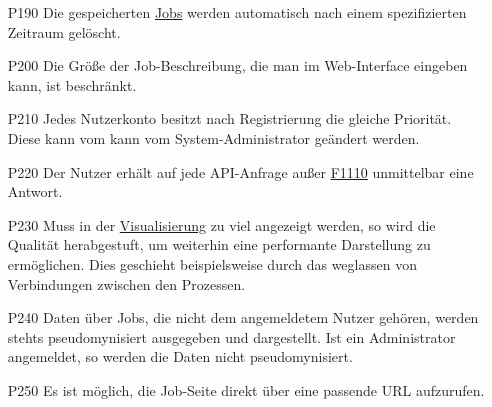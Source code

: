 \begin{itemize}[noitemsep]
    \item[P190] Die gespeicherten \hyperref[B:Jobs]{Jobs} werden automatisch nach einem spezifizierten Zeitraum gelöscht.

    \item[P200] Die Größe der Job-Beschreibung, die man im Web-Interface eingeben kann, ist beschränkt.

    
    \item[P210] Jedes \gls{Nutzerkonto} besitzt nach Registrierung die gleiche Priorität. Diese kann vom kann vom \gls{System-Administrator} geändert werden.
    
    
    \item[P220] Der \gls{Nutzer} erhält auf jede API-Anfrage außer \hyperref[FA:API:Andauernde Abfrage des Ergebnises eines Jobs]{F1110} unmittelbar eine  Antwort.
    
    \item[P230] Muss in der \hyperref[pages:visualization]{Visualisierung} zu viel angezeigt werden, so wird die Qualität herabgestuft, um weiterhin eine performante Darstellung zu ermöglichen. Dies geschieht beispielsweise durch das weglassen von Verbindungen zwischen den Prozessen.
    
    \item[P240] Daten über Jobs, die nicht dem angemeldetem Nutzer gehören, werden stehts pseudomynisiert ausgegeben und dargestellt. Ist ein Administrator  angemeldet, so werden die Daten nicht pseudomynisiert.
    
    \item[P250] Es ist möglich, die Job-Seite direkt über eine passende \gls{URL} aufzurufen.

    
\end{itemize}